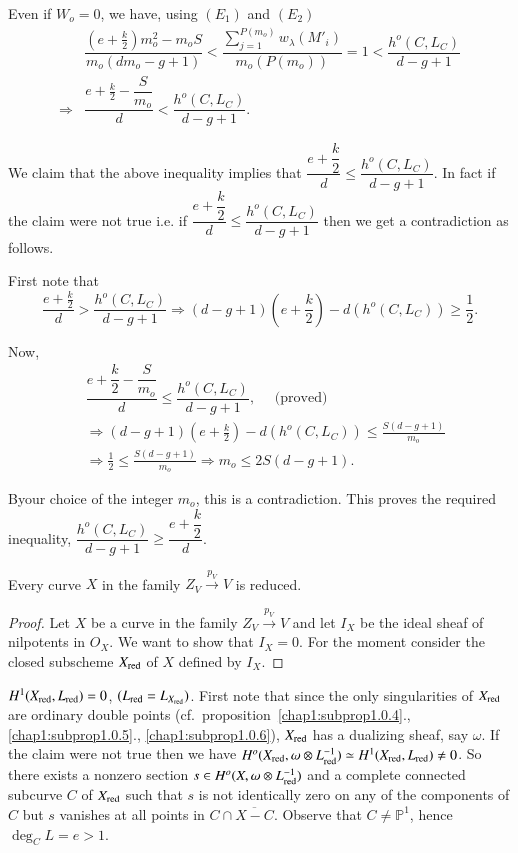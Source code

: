 {Even if $W_o = 0$, we have, using $(E_1)$ and $(E_2)$
\begin{align*}
& \dfrac{(e + \frac{k}{2})m^2_o - m_o S}{m_o (dm_o - g + 1)} <
\dfrac{\sum\limits^{P(m_o)} _{j=1} w_\lambda (M'_i)}{m_o
  (P(m_o))} = 1 < \dfrac{h^o (C, L_C)}{d- g+ 1}\\
\Longrightarrow & \dfrac{e + \frac{k}{2} - \dfrac{S}{m_o}} {d} <
\dfrac{h^o (C, L_C)}{d- g+ 1}. 
\end{align*}

\noindent
We claim that the above inequality implies that $\dfrac{e +
  \dfrac{k}{2}}{d} \le \dfrac{h^o (C, L_C)}{d- g+ 1}$. In fact if the
claim were not true i.e. if $\dfrac{e + \dfrac{k}{2}}{d} \le \dfrac{h^o
  (C, L_C)}{d- g+ 1}$ then we get a contradiction as follows. 

\noindent
First note that
$$
\frac{e + \frac{k}{2}}{d} > \frac{h^o (C, L_C)}{d- g+ 1}
\Longrightarrow (d - g + 1) (e + \frac{k}{2}) - d(h^o (C, L_C)) \ge
\frac{1}{2}. 
$$

\noindent
Now,
\begin{align*}
& \dfrac{e + \dfrac{k}{2} - \dfrac{S}{m_o}}{d} \le \dfrac{h^o (C,
  L_C)}{d- g+ 1}, \quad \text{ (proved)} \\
&\Longrightarrow (d - g  +1) (e + \frac{k}{2}) -d(h^o (C, L_C)) \le
  \frac{S(d-g+1)}{m_o}\\ 
&\Longrightarrow \frac{1}{2} \le \frac{S(d-g+1)}{m_o} \Longrightarrow
  m_o \le 2S(d-g+1). 
\end{align*}

\noindent
By\pageoriginale our choice of the integer $m_o$, this is a
contradiction. This proves the required inequality, $\dfrac{h^o (C,
  L_C)}{d- g+ 1} \ge \dfrac{e + \dfrac{k}{2}}{d}$.  

\begin{subprop}\label{chap1:subprop1.0.8}%
Every curve $X$ in the family $Z_V \xrightarrow{p_V}V$ is reduced. 
\end{subprop}

\begin{proof}
Let $X$ be a curve in the family $Z_V \xrightarrow{p_V}V$  and let
$I_X$ be the ideal sheaf of nilpotents in $O_X$. We want to show that
$I_X=0$. For the moment consider the closed subscheme $X_{\operatorname{red}}$ of $X$
defined by $I_X$. 
\end{proof}

\medskip
{}
$H^1 (X_{\operatorname{red}}, L_{\operatorname{red}})=0$, $(L_{\operatorname{red}} = L_{X_{\operatorname{red}}})$. First note
  that since the only singularities of $X_{\operatorname{red}}$ are ordinary double
  points (cf.\ proposition~\ref{chap1:subprop1.0.4}.,
  \ref{chap1:subprop1.0.5}., \ref{chap1:subprop1.0.6}), $X_{\operatorname{red}}$ has
  a   dualizing sheaf, say $\omega$. If the claim were not true then we
  have $H^o(X_{\operatorname{red}}, \omega \otimes L^{-1}_{\operatorname{red}}) \simeq H^1
  (X_{\operatorname{red}}, L_{\operatorname{red}}) \neq 0$. So there exists a nonzero section $s
  \in H^o (X, \omega \otimes L^{-1}_{\operatorname{red}})$ and a complete connected
  subcurve $C$ of $X_{\operatorname{red}}$ such that $s$ is not identically zero on
  any of the components of $C$ but $s$ vanishes at all points in $C
  \cap \overline{X-C}$. Observe that $C \neq \mathbb{P}^1$, hence
  $\deg_CL= e > 1$. 

}
